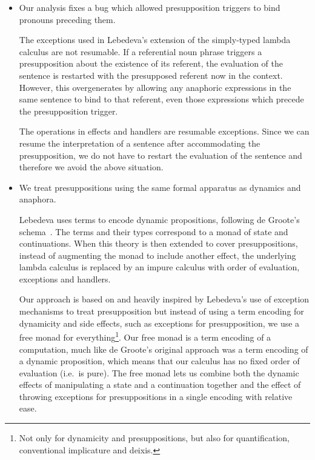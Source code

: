 \begin{itemize}
\item Our analysis fixes a bug which allowed presupposition triggers to
  bind pronouns preceding them.

  The exceptions used in Lebedeva's extension of the simply-typed lambda
  calculus are not resumable. If a referential noun phrase triggers a
  presupposition about the existence of its referent, the evaluation of the
  sentence is restarted with the presupposed referent now in the
  context. However, this overgenerates by allowing any anaphoric
  expressions in the same sentence to bind to that referent, even those
  expressions which precede the presupposition trigger.

  \begin{exe}
  \end{exe}

  The operations in effects and handlers are resumable exceptions. Since we
  can resume the interpretation of a sentence after accommodating the
  presupposition, we do not have to restart the evaluation of the sentence
  and therefore we avoid the above situation.

\item We treat presuppositions using the same formal apparatus as dynamics
  and anaphora.

  Lebedeva uses terms to encode dynamic propositions, following de Groote's
  schema~\cite{de2006towards}. The terms and their types correspond to a
  monad of state and continuations. When this theory is then extended to
  cover presuppositions, instead of augmenting the monad to include another
  effect, the underlying lambda calculus is replaced by an impure calculus
  with order of evaluation, exceptions and handlers.

  Our approach is based on and heavily inspired by Lebedeva's use of
  exception mechanisms to treat presupposition but instead of using a term
  encoding for dynamicity and side effects, such as exceptions for
  presupposition, we use a free monad for everything\footnote{Not only for
    dynamicity and presuppositions, but also for quantification,
    conventional implicature and deixis.}. Our free monad is a term
  encoding of a computation, much like de Groote's original approach was a
  term encoding of a dynamic proposition, which means that our calculus has
  no fixed order of evaluation (i.e.\ is pure). The free monad lets us
  combine both the dynamic effects of manipulating a state and a
  continuation together and the effect of throwing exceptions for
  presuppositions in a single encoding with relative ease.
\end{itemize}


